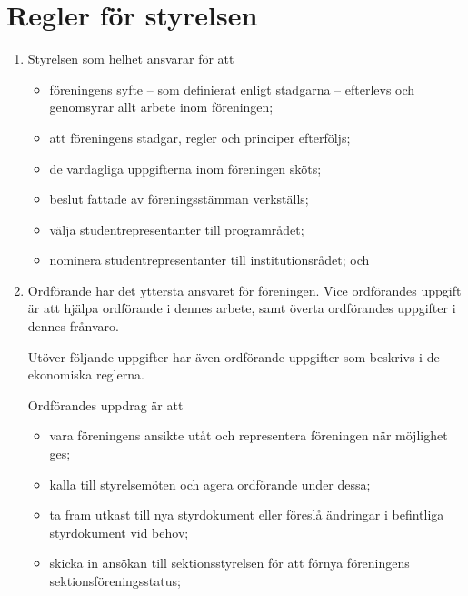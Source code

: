 \documentclass{dvd}
\begin{document}
\section{Regler för styrelsen}

\begin{enumerate}[label=\arabic* §, ref=\arabic*]
	\item Styrelsen som helhet ansvarar för att
	      \begin{itemize}
		      \item föreningens syfte -- som definierat enligt stadgarna -- efterlevs och genomsyrar allt arbete inom föreningen;

		      \item att föreningens stadgar, regler och principer efterföljs;

		      \item de vardagliga uppgifterna inom föreningen sköts;

		      \item beslut fattade av föreningsstämman verkställs;

		      \item välja studentrepresentanter till programrådet;

		      \item nominera studentrepresentanter till institutionsrådet; och
	      \end{itemize}

	\item Ordförande har det yttersta ansvaret för föreningen.
	      Vice ordförandes uppgift är att hjälpa ordförande i dennes arbete, samt överta ordförandes uppgifter i dennes frånvaro.

	      Utöver följande uppgifter har även ordförande uppgifter som beskrivs i de ekonomiska reglerna.

	      Ordförandes uppdrag är att
	      \begin{itemize}
		      \item vara föreningens ansikte utåt och representera föreningen när möjlighet ges;

		      \item kalla till styrelsemöten och agera ordförande under dessa;

		      \item ta fram utkast till nya styrdokument eller föreslå ändringar i befintliga styrdokument vid behov;

		      \item skicka in ansökan till sektionsstyrelsen för att förnya föreningens sektionsföreningsstatus;


\end{itemize}
\end{enumerate}
\end{document}

